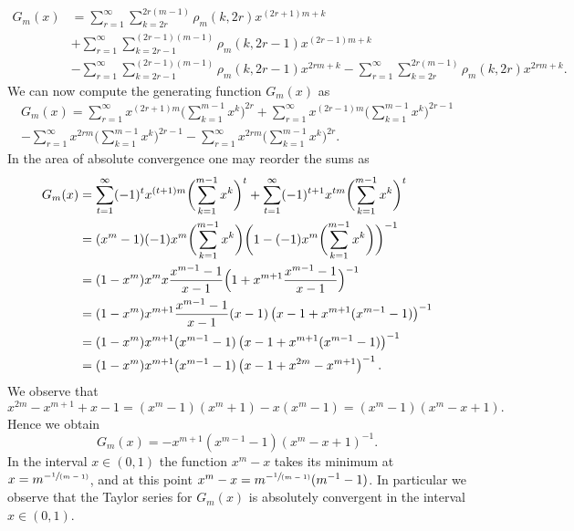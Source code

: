 \documentclass[11pt]{article}
\numberwithin{equation}{section}
\newcommand{\spfrac}[2]{\sfrac{#1}{(#2)}}
\theoremstyle{definition}
\numberwithin{theorem}{section}
\begin{document}
\begin{equation*}
\begin{split}
G_m(x)&=\sum_{r=1}^{\infty} \sum_{k=2r}^{2r(m-1)}\rho_m(k,2r)x^{(2r+1)m+k}\\
&+ \sum_{r=1}^\infty\sum_{k=2r-1}^{(2r-1)(m-1)}\rho_m(k,2r-1)x^{(2r-1)m+k}\\
&-\sum_{r=1}^\infty \sum_{k=2r-1}^{(2r-1)(m-1)}\rho_m(k,2r-1)x^{2rm+k}-\sum_{r=1}^\infty\sum_{k=2r}^{2r(m-1)}\rho_m(k,2r)x^{2rm+k}.
\end{split}
\end{equation*}
We can now compute the generating function $G_m(x)$ as
\begin{multline*}
G_m(x)= \sum_{r=1}^{\infty} x^{(2r+1)m}\biggl(\sum_{k=1}^{m-1}x^k\biggr)^{2r}+ \sum_{r=1}^\infty x^{(2r-1)m}\biggl(\sum_{k=1}^{m-1}x^k\biggr)^{2r-1}\\
-\sum_{r=1}^\infty x^{2rm}\biggl(\sum_{k=1}^{m-1}x^k\biggr)^{2r-1} -\sum_{r=1}^\infty x^{2rm}\biggl(\sum_{k=1}^{m-1}x^k\biggr)^{2r}.
\end{multline*}
In the area of absolute convergence one may reorder the sums as
\begin{equation*}
\begin{split}
G_m(x)&=\sum_{t=1}^{\infty} (-1)^{t} x^{(t+1)m}\biggl(\sum_{k=1}^{m-1}x^k\biggr)^{t}+ \sum_{t=1}^{\infty} (-1)^{t+1} x^{tm}\biggl(\sum_{k=1}^{m-1}x^k\biggr)^{t}\\
&= (x^m-1)(-1)x^m\biggl(\sum_{k=1}^{m-1}x^k\biggr) \biggl(1- (-1)x^m\biggl(\sum_{k=1}^{m-1}x^k\biggr) \biggr)^{-1}\\
&= (1-x^m)x^mx \frac{x^{m-1}-1}{x-1}\Bigl(1+x^{m+1} \frac{x^{m-1}-1}{x-1}\Bigr)^{-1}\\
&= (1-x^m)x^{m+1} \frac{x^{m-1}-1}{x-1}(x-1)\left(x-1+x^{m+1} (x^{m-1}-1)\right)^{-1}\\
&= (1-x^m)x^{m+1} (x^{m-1}-1)\left(x-1+x^{m+1} (x^{m-1}-1)\right)^{-1}\\
&= (1-x^m)x^{m+1} (x^{m-1}-1)\left(x-1+x^{2m}-x^{m+1}\right)^{-1}.
\end{split}
\end{equation*}
We observe that
\[
x^{2m}-x^{m+1}+x-1= (x^m-1)(x^m +1)-x(x^m-1) = (x^m-1)(x^m-x+1).
\]
Hence we obtain
\[
G_m(x)=- x^{m+1} (x^{m-1}-1)\left(x^m-x+1\right)^{-1}.
\]
In the interval $x\in (0,1)$ the function $x^m-x$ takes its minimum at $x=m^{-\spfrac{1}{m-1}}$, and at this point $x^m-x=m^{-\spfrac{1}{m-1}}(m^{-1}-1)$. In particular we observe that the Taylor series for $G_m(x)$ is absolutely convergent in the interval $x\in (0,1)$.\par
\end{document}
